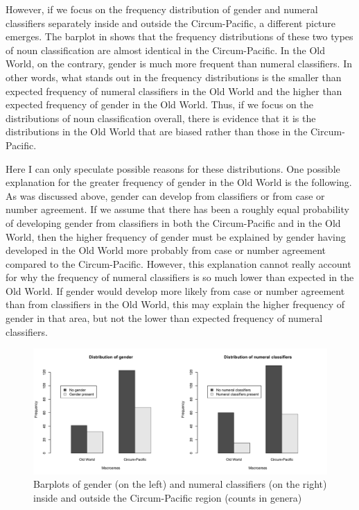\documentclass[output=collectionpaper]{langsci/langscibook}
\begin{document}
However, if we focus on the frequency distribution of gender and numeral classifiers separately inside and outside the Circum-Pacific, a different picture emerges. The barplot in  shows that the frequency distributions of these two types of noun classification are almost identical in the Circum-Pacific. In the Old World, on the contrary, gender is much more frequent than numeral classifiers. In other words, what stands out in the frequency distributions is the smaller than expected frequency of numeral classifiers in the Old World and the higher than expected frequency of gender in the Old World. Thus, if we focus on the distributions of noun classification overall, there is evidence that it is the distributions in the Old World that are biased rather than those in the Circum-Pacific.

Here I can only speculate possible reasons for these distributions. One possible explanation for the greater frequency of gender in the Old World is the following. As was discussed above, gender can develop from classifiers or from case or number agreement. If we assume that there has been a roughly equal probability of developing gender from classifiers in both the Circum-Pacific and in the Old World, then the higher frequency of gender must be explained by gender having developed in the Old World more probably from case or number agreement compared to the Circum-Pacific. However, this explanation cannot really account for why the frequency of numeral classifiers is so much lower than expected in the Old World. If gender would develop more likely from case or number agreement than from classifiers in the Old World, this may explain the higher frequency of gender in that area, but not the lower than expected frequency of numeral classifiers.

\begin{figure}
\includegraphics[width=\textwidth]{figures/13/Fig6_barplots}
\caption{Barplots of gender (on the left) and numeral classifiers (on the right) inside and outside the Circum-Pacific region (counts in genera)}
\label{fig:Sinne:6}
\end{figure}
\end{document}
